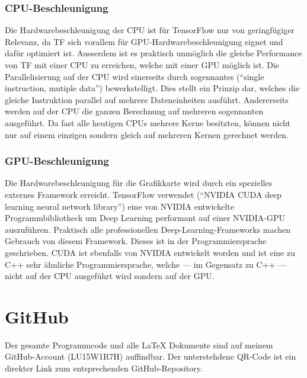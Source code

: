 \begin{appendices}
\subsection*{CPU-Beschleunigung}
Die Hardwarebeschleunigung der CPU ist für TensorFlow nur von geringfügiger
Relevanz, da TF sich vorallem für GPU-Hardwarebeschleunigung eignet
und dafür optimiert ist. Ausserdem ist es praktisch unmöglich die gleiche
Performance von TF mit einer CPU zu erreichen, welche mit einer GPU möglich ist.
\para{}
Die Parallelisierung auf der CPU wird einerseits durch sogennantes 
(``single instruction, mutiple data'') bewerkstelligt. Dies stellt ein Prinzip
dar, welches die gleiche Instruktion parallel auf mehrere Dateneinheiten
ausführt.
Andererseits werden auf der CPU die ganzen Berechnung auf mehreren sogennanten
 ausgeführt. Da fast alle heutigen CPUs mehrere Kerne
besitzten, können nicht nur auf einem einzigen sondern gleich auf mehreren
Kernen gerechnet werden.

\subsection*{GPU-Beschleunigung}
Die Hardwarebeschleunigung für die Grafikkarte wird durch ein spezielles
externes Framework erreicht. TensorFlow verwendet  (``NVIDIA CUDA
deep learning neural network library'') eine von
NVIDIA entwickelte Programmbibliotheck um Deep Learning performant auf einer NVIDIA-GPU
auszuführen. Praktisch alle professionellen Deep-Learning-Frameworks machen
Gebrauch von diesem Framework. Dieses ist in der Programmiersprache
 geschrieben. CUDA ist ebenfalls von NVIDIA entwickelt worden und
ist eine zu C++ sehr ähnliche Programmiersprache, welche --- im Gegensatz zu C++
--- nicht auf der CPU ausgeführt wird sondern auf der GPU.


\chapter{GitHub}
Der gesamte Programmcode und alle \LaTeX{} Dokumente sind auf meinem
GitHub-Account (LU15W1R7H) auffindbar. Der unterstehdene QR-Code ist ein
direkter Link zum entsprechenden GitHub-Repository.
\para{}


\end{appendices}

\printbibliography[heading=bibintoc]

